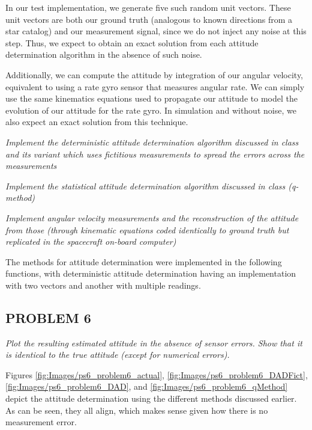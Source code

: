 In our test implementation, we generate five such random unit vectors. These unit vectors are both our ground truth (analogous to known directions from a star catalog) and our measurement signal, since we do not inject any noise at this step. Thus, we expect to obtain an exact solution from each attitude determination algorithm in the absence of such noise.

Additionally, we can compute the attitude by integration of our angular velocity, equivalent to using a rate gyro sensor that measures angular rate. We can simply use the same kinematics equations used to propagate our attitude to model the evolution of our attitude for the rate gyro. In simulation and without noise, we also expect an exact solution from this technique.

\textit{Implement the deterministic attitude determination algorithm discussed in class and its variant which uses fictitious measurements to spread the errors across the measurements}

\textit{Implement the statistical attitude determination algorithm discussed in class (q-method)}

\textit{Implement angular velocity measurements and the reconstruction of the attitude from those (through kinematic equations coded identically to ground truth but replicated in the spacecraft on-board computer)}

The methods for attitude determination were implemented in the following functions, with deterministic attitude determination having an implementation with two vectors and another with multiple readings.







\subsection{PROBLEM 6}
\textit{Plot the resulting estimated attitude in the absence of sensor errors. Show that it is identical to the true attitude (except for numerical errors).}

Figures \ref{fig:Images/ps6_problem6_actual}, \ref{fig:Images/ps6_problem6_DADFict}, \ref{fig:Images/ps6_problem6_DAD}, and \ref{fig:Images/ps6_problem6_qMethod} depict the attitude determination using the different methods discussed earlier. As can be seen, they all align, which makes sense given how there is no measurement error.

